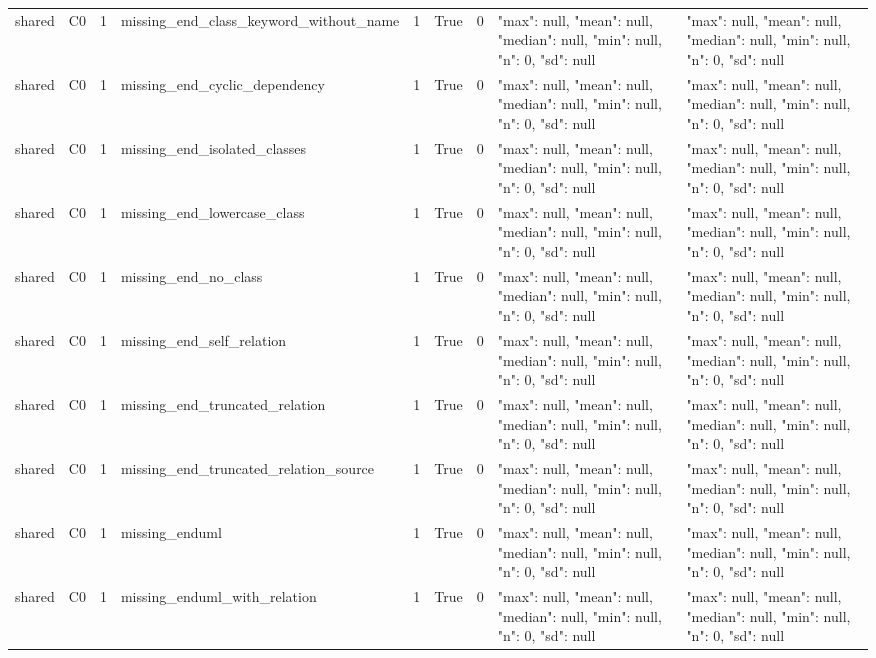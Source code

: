 \begin{tabular}{lllllllll}
shared & C0 & 1 & missing\_end\_class\_keyword\_without\_name & 1 & True & 0 & {"max": null, "mean": null, "median": null, "min": null, "n": 0, "sd": null} & {"max": null, "mean": null, "median": null, "min": null, "n": 0, "sd": null} \\
shared & C0 & 1 & missing\_end\_cyclic\_dependency & 1 & True & 0 & {"max": null, "mean": null, "median": null, "min": null, "n": 0, "sd": null} & {"max": null, "mean": null, "median": null, "min": null, "n": 0, "sd": null} \\
shared & C0 & 1 & missing\_end\_isolated\_classes & 1 & True & 0 & {"max": null, "mean": null, "median": null, "min": null, "n": 0, "sd": null} & {"max": null, "mean": null, "median": null, "min": null, "n": 0, "sd": null} \\
shared & C0 & 1 & missing\_end\_lowercase\_class & 1 & True & 0 & {"max": null, "mean": null, "median": null, "min": null, "n": 0, "sd": null} & {"max": null, "mean": null, "median": null, "min": null, "n": 0, "sd": null} \\
shared & C0 & 1 & missing\_end\_no\_class & 1 & True & 0 & {"max": null, "mean": null, "median": null, "min": null, "n": 0, "sd": null} & {"max": null, "mean": null, "median": null, "min": null, "n": 0, "sd": null} \\
shared & C0 & 1 & missing\_end\_self\_relation & 1 & True & 0 & {"max": null, "mean": null, "median": null, "min": null, "n": 0, "sd": null} & {"max": null, "mean": null, "median": null, "min": null, "n": 0, "sd": null} \\
shared & C0 & 1 & missing\_end\_truncated\_relation & 1 & True & 0 & {"max": null, "mean": null, "median": null, "min": null, "n": 0, "sd": null} & {"max": null, "mean": null, "median": null, "min": null, "n": 0, "sd": null} \\
shared & C0 & 1 & missing\_end\_truncated\_relation\_source & 1 & True & 0 & {"max": null, "mean": null, "median": null, "min": null, "n": 0, "sd": null} & {"max": null, "mean": null, "median": null, "min": null, "n": 0, "sd": null} \\
shared & C0 & 1 & missing\_enduml & 1 & True & 0 & {"max": null, "mean": null, "median": null, "min": null, "n": 0, "sd": null} & {"max": null, "mean": null, "median": null, "min": null, "n": 0, "sd": null} \\
shared & C0 & 1 & missing\_enduml\_with\_relation & 1 & True & 0 & {"max": null, "mean": null, "median": null, "min": null, "n": 0, "sd": null} & {"max": null, "mean": null, "median": null, "min": null, "n": 0, "sd": null} \\

\end{tabular}
